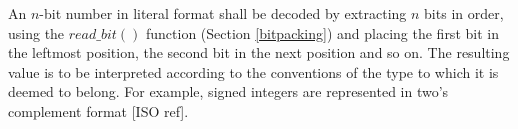 An $n$-bit number in literal format shall be decoded by extracting $n$ bits
in order, using the $read\_bit()$ function (Section \ref{bitpacking})
 and placing the first bit in the leftmost position, the second
bit in the next position and so on. The resulting value is to be
interpreted according to the conventions of the type to which it is
deemed to belong. For example, signed integers are represented in
two's complement format [ISO ref].

